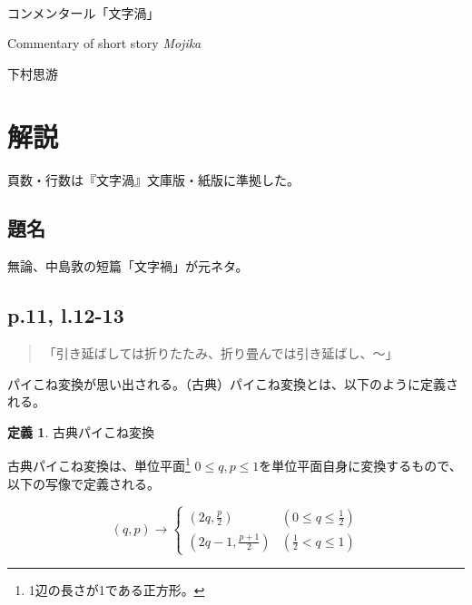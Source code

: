 \documentclass[10pt, a5paper, twoside]{jsarticle}
\theoremstyle{definition}
\newtheorem{dfn}{定義}
\begin{document}
	{\Large 　} %

	\begin{center}

		\Large{コンメンタール「文字渦」}

		\vspace{3mm}

		\large{Commentary of short story \textit{Mojika}}

		\vspace{3mm}
		
		\large{下村思游}

	\end{center}

	\vspace{3mm}

	\section{解説}

		頁数・行数は『文字渦』文庫版・紙版\cite{mojika}に準拠した。

		\subsection{題名}

		無論、中島敦の短篇「文字禍」が元ネタ。

		\subsection{p.11, l.12-13}

		\begin{quote}
			
			「引き延ばしては折りたたみ、折り畳んでは引き延ばし、〜」
		
		\end{quote}
		
		パイこね変換が思い出される。（古典）パイこね変換とは、以下のように定義される\cite{pie}。

		\begin{dfn}

			古典パイこね変換
			
			古典パイこね変換は、単位平面\footnote{1辺の長さが1である正方形。} $0 \leq q, p \leq 1$を単位平面自身に変換するもので、以下の写像で定義される。
			
			\begin{equation*}
				(q, p) \rightarrow \begin{cases} (2q, \frac{p}{2}) & (0 \leq q \leq \frac{1}{2}) \\ (2q-1, \frac{p+1}{2}) & (\frac{1}{2} < q \leq 1) \end{cases}
			\end{equation*}

		\end{dfn}
\end{document}
